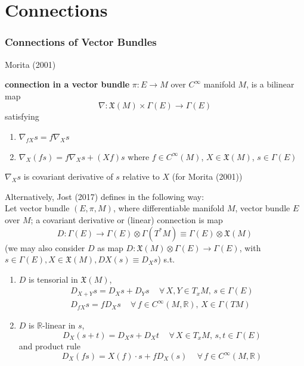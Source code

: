 \part{Connections}


\section{Connections of Vector Bundles}

Morita (2001) \cite{dgdt:Mori2001}

\begin{definition}
	\textbf{connection in a vector bundle} $\pi : E \to M$ over $C^{\infty}$ manifold $M$, is a bilinear map
	\[
	\nabla : \mathfrak{X}(M) \times \Gamma(E) \to \Gamma(E)
	\]
	satisfying
	\begin{enumerate}
		\item[(i)] $\nabla_{fX} s = f\nabla_X s$
		\item[(ii)] $\nabla_X(fs) = f\nabla_Xs + (Xf)s$ where $f\in C^{\infty}(M)$, $X \in \mathfrak{X}(M)$, $s\in \Gamma(E)$
	\end{enumerate}
$\nabla_Xs$ is covariant derivative of $s$ relative to $X$ (for Morita (2001)\cite{dgdt:Mori2001})

Alternatively, Jost (2017) \cite{dgdt:Jost2017} defines in the following way: \\

Let vector bundle $(E, \pi, M)$, where differentiable manifold $M$, vector bundle $E$ over $M$; a covariant derivative or (linear) connection is map
\begin{equation}
	D:\Gamma(E) \to \Gamma(E) \otimes \Gamma(T^*M) \equiv \Gamma(E) \otimes \mathfrak{X}(M)
\end{equation}
(we may also consider $D$ as map $D: \mathfrak{X}(M) \otimes \Gamma(E) \to \Gamma(E)$, with $s \in \Gamma(E), X \in \mathfrak{X}(M), DX(s) \equiv D_X s$) s.t.

\begin{enumerate}
	\item $D$ is tensorial in $\mathfrak{X}(M)$, 
	\begin{equation}
		\begin{gathered}
			D_{X +Y} s = D_X s + D_Y s \quad \, \forall \, X,Y \in T_xM, \, s\in \Gamma(E) \\
			D_{fX} s = fD_X s \quad \, \forall \, f \in C^{\infty}(M, \mathbb{R}), \, X \in \Gamma(TM)
		\end{gathered}
	\end{equation}
\item $D$ is $\mathbb{R}$-linear in $s$, 
\begin{equation}
	D_X(s+t ) = D_X s + D_X t \quad \, \forall \, X \in T_xM , \, s,t \in \Gamma(E) 
\end{equation}
and product rule
\begin{equation}
	D_X(fs) = X(f) \cdot s + fD_X(s) \quad \, \forall \, f \in C^{\infty} (M, \mathbb{R})
\end{equation}
\end{enumerate}

\end{definition} 

